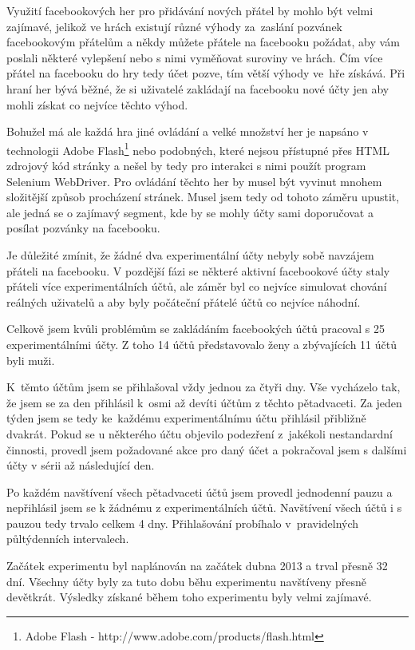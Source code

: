 \documentclass[thesis=M,czech]{FITthesis}[2013/05/10]
\begin{document}
Využití facebookových her pro přidávání nových přátel by mohlo být velmi zajímavé, jelikož ve hrách existují různé výhody za~zaslání pozvánek facebookovým přátelům a někdy můžete přátele na facebooku požádat, aby vám poslali některé vylepšení nebo s nimi vyměňovat suroviny ve hrách. Čím více přátel na facebooku do hry tedy účet pozve, tím větší výhody ve~hře získává. Při hraní her bývá běžné, že si uživatelé zakládají na facebooku nové účty jen aby mohli získat co nejvíce těchto výhod.

Bohužel má ale každá hra jiné ovládání a velké množství her je napsáno v technologii Adobe Flash\footnote{Adobe Flash - http://www.adobe.com/products/flash.html} nebo podobných, které nejsou přístupné přes HTML zdrojový kód stránky a nešel by tedy pro interakci s nimi použít program Selenium WebDriver. Pro ovládání těchto her by musel být vyvinut mnohem složitější způsob procházení stránek. Musel jsem tedy od tohoto záměru upustit, ale jedná se o zajímavý segment, kde by se mohly účty sami doporučovat a posílat pozvánky na facebooku.

Je důležité zmínit, že žádné dva experimentální účty nebyly sobě navzájem přáteli na facebooku. V pozdější fázi se některé aktivní facebookové účty staly přáteli více experimentálních účtů, ale záměr byl co nejvíce simulovat chování reálných uživatelů a aby byly počáteční přátelé účtů co nejvíce náhodní.

Celkově jsem kvůli problémům se zakládáním facebookých účtů pracoval s 25 experimentálními účty. Z toho 14 účtů představovalo ženy a zbývajících 11 účtů byli muži. 

K~těmto účtům jsem se přihlašoval vždy jednou za čtyři dny. Vše vycházelo tak, že jsem se za den přihlásil k~osmi až devíti účtům z těchto pětadvaceti. Za jeden týden jsem se tedy ke~každému experimentálnímu účtu přihlásil přibližně dvakrát. Pokud se u některého účtu objevilo podezření z~jakékoli nestandardní činnosti, provedl jsem požadované akce pro daný účet a pokračoval jsem s dalšími účty v sérii až následující den.

Po každém navštívení všech pětadvaceti účtů jsem provedl jednodenní pauzu a nepřihlásil jsem se k žádnému z experimentálních účtů. Navštívení všech účtů i s pauzou tedy trvalo celkem 4 dny. Přihlašování probíhalo v~pravidelných půltýdenních intervalech.

Začátek experimentu byl naplánován na začátek dubna 2013 a trval přesně 32 dní. Všechny účty byly za tuto dobu běhu experimentu navštíveny přesně devětkrát. Výsledky získané během toho experimentu byly velmi zajímavé.
\end{document}
